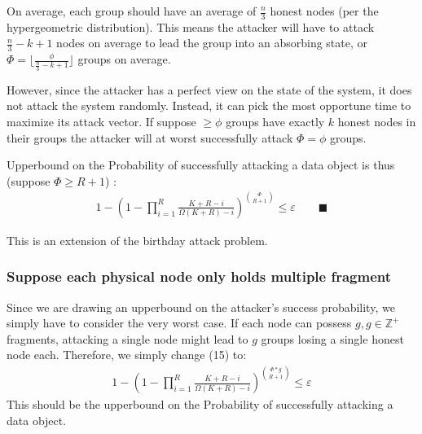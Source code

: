On average, each group should have an average of $\frac{n}{3}$ honest nodes (per the hypergeometric distribution). This means the attacker will have to attack $\frac{n}{3} - k+1$ nodes on average to lead the group into an absorbing state, or $\Phi= \lfloor\frac{\phi}{\frac{n}{3}-k+1} \rfloor$ groups on average. 


However, since the attacker has a perfect view on the state of the system, it does not attack the system randomly. Instead, it can pick the most opportune time to maximize its attack vector. If suppose $\geq \phi$ groups have exactly $k$ honest nodes in their groups the attacker will at worst successfully attack $\Phi  = \phi$ groups. 

Upperbound on the Probability of successfully attacking a data object is thus (suppose $\Phi \geq R+1$) :
\begin{gather}
    1-
    \left(
    1-\prod_{i=1}^{R}\frac{K+R-i}{\Omega(K+R)-i}
    \right)^{\binom{\Phi}{R+1}}  \leq \varepsilon
    \qquad\blacksquare
\end{gather}

This is an extension of the birthday attack problem. 

\subsubsection{Suppose each physical node only holds multiple fragment}
Since we are drawing an upperbound on the attacker's success probability, we simply have to consider the very worst case. 
If each node can possess $g,g\in \mathbb{Z}^{+}$ fragments, attacking a single node might lead to $g$ groups losing a single honest node each. 
Therefore, we simply change (15) to:
\begin{gather}
    1-
    \left(
    1-\prod_{i=1}^{R}\frac{K+R-i}{\Omega(K+R)-i}
    \right)^{\binom{\Phi*g}{R+1}} \leq \varepsilon
\end{gather}
This should be the upperbound on the Probability of successfully attacking a data object. 